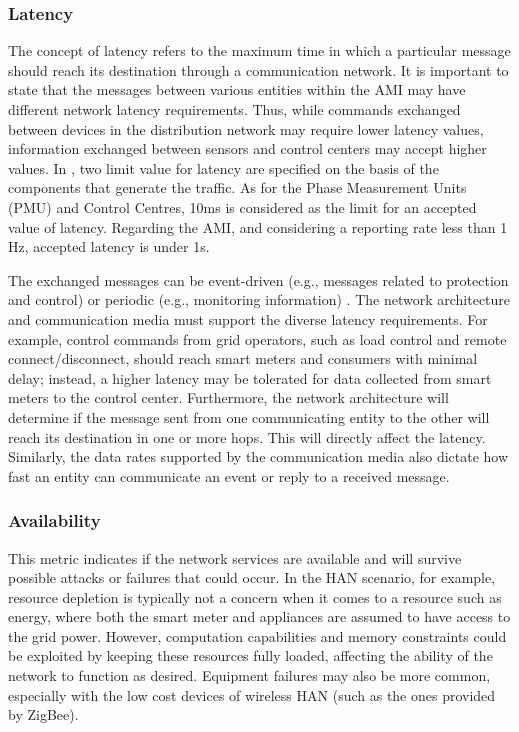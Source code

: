 \documentclass[11pt,draftclsnofoot,onecolumn]{IEEEtran}
\begin{document}
\subsubsection{Latency}

The concept of latency refers to the maximum time in which a particular message should reach its destination through a communication network. It is important to state that the messages between various entities within the AMI may have different network latency requirements. Thus, while commands exchanged between devices in the distribution network may require lower latency values, information exchanged between sensors and control centers may accept higher values. In \cite{Xu2011}, two limit value for latency are specified on the basis of the components that generate the traffic. As for the Phase Measurement Units (PMU) and Control Centres, 10ms is considered as the limit for an accepted value of latency.  Regarding the AMI, and considering a reporting rate less than 1 Hz, accepted latency is under 1s.

The exchanged messages can be event-driven (e.g., messages related to protection and control) or periodic (e.g., monitoring information) \cite{Winter2012}. The network architecture and communication media must support the diverse latency requirements. For example, control commands from grid operators, such as load control and remote connect/disconnect, should reach smart meters and consumers with minimal delay; instead, a higher latency may be tolerated for data collected from smart meters to the control center. Furthermore, the network architecture will determine if the message sent from one communicating entity to the other will reach its destination in one or more hops. This will directly affect the latency. Similarly, the data rates supported by the communication media also dictate how fast an entity can communicate an event or reply to a received message. 

\subsubsection{Availability}

 This metric indicates if the network services are available and will survive possible attacks or failures that could occur. In the HAN scenario, for example, resource depletion is typically not a concern when it comes to a resource such as energy, where both the smart meter and appliances are assumed to have access to the grid power. However, computation capabilities and memory constraints could be exploited by keeping these resources fully loaded, affecting the ability of the network to function as desired. Equipment failures may also be more common, especially with the low cost devices of wireless HAN (such as the ones provided by ZigBee).
\end{document}
